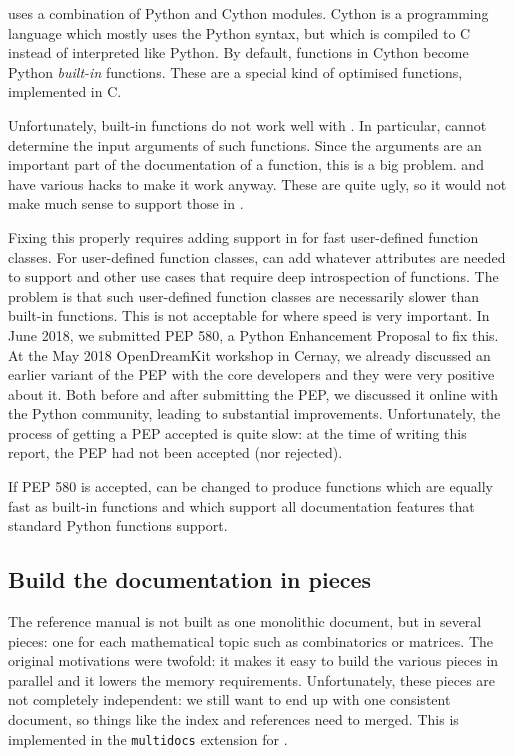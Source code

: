 \documentclass{deliverablereport}
\begin{document}
\Sage uses a combination of Python and Cython modules.
Cython is a programming language which mostly uses the Python syntax,
but which is compiled to C instead of interpreted like Python.
By default, functions in Cython become Python \emph{built-in} functions.
These are a special kind of optimised functions, implemented in C.

Unfortunately, built-in functions do not work well with \Sphinx.
In particular, \Sphinx cannot determine the input arguments of such functions.
Since the arguments are an important part of the documentation
of a function, this is a big problem.
\Sage and \Cython have various hacks to make it work anyway.
These are quite ugly, so it would not make much sense to support those in \Sphinx.

Fixing this properly requires adding support in \Python
for fast user-defined function classes.
For user-defined function classes, \Cython can add whatever attributes
are needed to support \Sphinx and other use cases that require deep introspection
of functions.
The problem is that such user-defined function classes
are necessarily slower than built-in functions.
This is not acceptable for \Sage where speed is very important.
In June 2018, we submitted PEP 580, a Python Enhancement Proposal to fix this.
At the May 2018 OpenDreamKit workshop in Cernay,
we already discussed an earlier variant of the PEP
with the core \Cython developers and they were very positive about it.
Both before and after submitting the PEP,
we discussed it online with the Python community,
leading to substantial improvements.
Unfortunately, the process of getting a PEP accepted is quite slow:
at the time of writing this report, the PEP had not been accepted (nor rejected).

If PEP 580 is accepted, \Cython can be changed to produce
functions which are equally fast as built-in functions
and which support all documentation
features that standard Python functions support.

\subsection{Build the documentation in pieces}\label{pieces}

The \Sage reference manual is not built as one monolithic document,
but in several pieces:
one for each mathematical topic such as combinatorics or matrices.
The original motivations were twofold: it makes it easy to build the various pieces
in parallel and it lowers the memory requirements.
Unfortunately, these pieces are not completely independent:
we still want to end up with one consistent document,
so things like the index and references need to merged.
This is implemented in the \Sage \texttt{multidocs} extension for \Sphinx.
\end{document}

